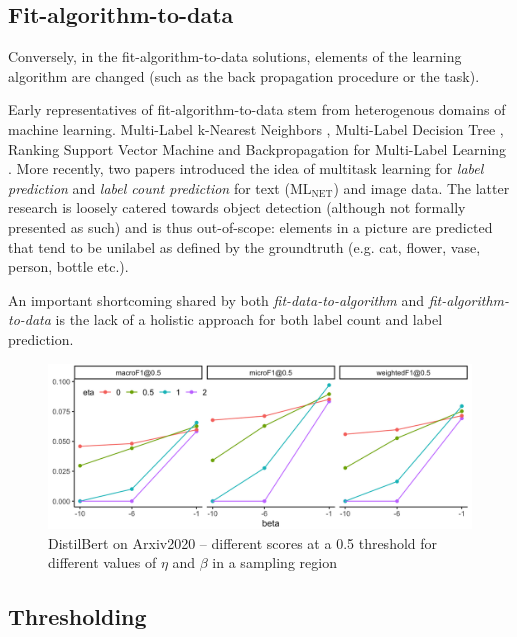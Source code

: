 \subsection{Fit-algorithm-to-data}
Conversely, in the fit-algorithm-to-data solutions, elements of the learning
algorithm are changed (such as the back propagation procedure or the task).

Early representatives of fit-algorithm-to-data stem from heterogenous domains
of machine learning. Multi-Label k-Nearest Neighbors \cite{ML-KNN},
Multi-Label Decision Tree \cite{ML-DT}, Ranking Support Vector Machine
\cite{multilabelSVM} and Backpropagation for Multi-Label Learning
\cite{multilabelBackprop}. More recently, two papers introduced the idea of
multitask learning for \emph{label prediction} and \emph{label count
prediction} for text (ML\(_{\text{NET}}\)) \cite{multitaskLabel} and image
\cite{multitaskLabelImages, tencent} data. The latter research is loosely
catered towards object detection (although not formally presented as such) and
is thus out-of-scope: elements in a picture are predicted that tend to be
unilabel as defined by the groundtruth (e.g. cat, flower, vase, person, bottle
etc.).

An important shortcoming shared by both \emph{fit-data-to-algorithm} and
\emph{fit-algorithm-to-data} is the lack of a holistic approach for both label
count and label prediction.

\begin{figure}[t!]
\centering
\includegraphics[width=.9\linewidth]{./images/betaEtaResized.png}
\caption{\label{fig:betaEta}
DistilBert on Arxiv2020 – different scores at a 0.5 threshold for different values of $\eta$ and $\beta$ in a sampling region}
\end{figure}

\subsection{Thresholding}
\label{subsec:thresh}

